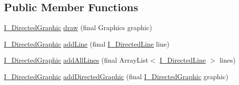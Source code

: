 \subsection*{Public Member Functions}
\begin{DoxyCompactItemize}
\item 
\hyperlink{interfaceorg_1_1tzi_1_1use_1_1gui_1_1views_1_1diagrams_1_1util_1_1_i___directed_graphic}{I\-\_\-\-Directed\-Graphic} \hyperlink{classorg_1_1tzi_1_1use_1_1gui_1_1views_1_1diagrams_1_1util_1_1_filled_directed_graphic_a857ea26015ca80c655b00de491c8d6db}{draw} (final Graphics graphic)
\item 
\hyperlink{interfaceorg_1_1tzi_1_1use_1_1gui_1_1views_1_1diagrams_1_1util_1_1_i___directed_graphic}{I\-\_\-\-Directed\-Graphic} \hyperlink{classorg_1_1tzi_1_1use_1_1gui_1_1views_1_1diagrams_1_1util_1_1_filled_directed_graphic_ab696df8b278009c14783348a2f8d073e}{add\-Line} (final \hyperlink{interfaceorg_1_1tzi_1_1use_1_1gui_1_1views_1_1diagrams_1_1util_1_1_i___directed_line}{I\-\_\-\-Directed\-Line} line)
\item 
\hyperlink{interfaceorg_1_1tzi_1_1use_1_1gui_1_1views_1_1diagrams_1_1util_1_1_i___directed_graphic}{I\-\_\-\-Directed\-Graphic} \hyperlink{classorg_1_1tzi_1_1use_1_1gui_1_1views_1_1diagrams_1_1util_1_1_filled_directed_graphic_a60b59dc1f79c01262c51c697547565d8}{add\-All\-Lines} (final Array\-List$<$ \hyperlink{interfaceorg_1_1tzi_1_1use_1_1gui_1_1views_1_1diagrams_1_1util_1_1_i___directed_line}{I\-\_\-\-Directed\-Line} $>$ lines)
\item 
\hyperlink{interfaceorg_1_1tzi_1_1use_1_1gui_1_1views_1_1diagrams_1_1util_1_1_i___directed_graphic}{I\-\_\-\-Directed\-Graphic} \hyperlink{classorg_1_1tzi_1_1use_1_1gui_1_1views_1_1diagrams_1_1util_1_1_filled_directed_graphic_a96a17c38581fa01f44acbf44b551b80f}{add\-Directed\-Graphic} (final \hyperlink{interfaceorg_1_1tzi_1_1use_1_1gui_1_1views_1_1diagrams_1_1util_1_1_i___directed_graphic}{I\-\_\-\-Directed\-Graphic} graphic)
\end{DoxyCompactItemize}
